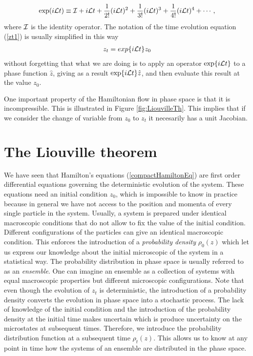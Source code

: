\documentclass[b5paper,openright,10pt]{book}
\begin{document}
\begin{align}
  {\rm exp}(i{\cal L}t) \equiv {\cal I} + i{\cal L}t + \frac{1}{2!}(i{\cal L}t)^2 + \frac{1}{3!}(i{\cal L}t)^3 +  \frac{1}{4!}(i{\cal L}t)^4 + \cdots,
\end{align}
where ${\cal I}$ is the identity operator.
The notation of the time evolution equation (\ref{zt1}) is usually simplified in this way 
\begin{align}
  z_t = exp\{i{\cal L}t\}z_0
  \label{zt}
\end{align}
without forgetting that what we are doing is to apply an operator ${\rm exp}\{i{\cal L}t\}$ to a phase function $\hat{z}$, giving as a result ${\rm exp}\{i{\cal L}t\}\hat{z}$, and then evaluate this result at the value $z_0$.

One important property of the  Hamiltonian flow in phase space is
  that   it  is   incompressible.  This   is  illustrated   in  Figure
  \ref{fig:LiouvilleTh}. This  implies that if we  consider the change
  of variable from $z_0$ to $z_t$ it necesarily has a unit Jacobian.
\section{The Liouville theorem}
We have seen that Hamilton's equations (\ref{compactHamiltonEq}) are first order differential equations governing the deterministic evolution of the system. 
These equations need an initial condition $z_0$, which is impossible to know in practice because in general we have not access to the position and momenta of every single particle in the system. Usually, a system is prepared under identical macroscopic conditions that do not allow to fix the value of the initial condition. 
Different configurations of the particles can give an identical macroscopic condition. 
This enforces the introduction of a {\it probability density} $\rho_0(z)$ which let us express our knowledge about the initial microscopic of the system in a statistical way. The probability distribution in phase space is usually referred to as an {\it ensemble}. One can imagine an ensemble as a collection of systems with equal macroscopic properties but different microscopic configurations.
Note that even though the evolution of $z_t$ is deterministic, the introduction of a probability density converts the evolution in phase space into a stochastic process.
The lack of knowledge of the initial condition and the introduction of the probability density at the initial time makes uncertain which is produce uncertainty on the microstates at subsequent times. Therefore, we introduce the probability distribution function at a subsequent time $\rho_t(z)$.
This allows us to know at any point in time how the systems of an ensemble are distributed in the phase space.
\end{document}
